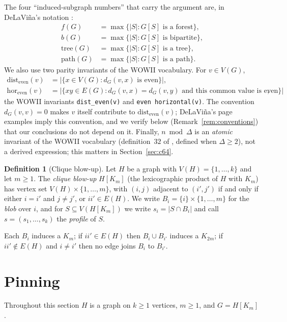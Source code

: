 \documentclass[10pt,a4paper]{article}
\theoremstyle{plain}
\theoremstyle{definition}
\newtheorem{definition}[theorem]{Definition}
\newcommand{\forestnum}{f}
\newcommand{\bipnum}{b}
\newcommand{\treenum}{\mathrm{tree}}
\newcommand{\pathnum}{\mathrm{path}}
\newcommand{\de}{\mathrm{dist_{even}}}
\newcommand{\eh}{\mathrm{hor_{even}}}
\begin{document}
The four ``induced-subgraph numbers'' that carry the argument are, in DeLaVi\~na's notation
\cite{wowiidefs}:
\[
\begin{array}{ll}
\forestnum(G) &= \max\{|S| : G[S] \text{ is a forest}\},\\
\bipnum(G)    &= \max\{|S| : G[S] \text{ is bipartite}\},\\
\treenum(G)   &= \max\{|S| : G[S] \text{ is a tree}\},\\
\pathnum(G)   &= \max\{|S| : G[S] \text{ is a path}\}.
\end{array}
\]
We also use two parity invariants of the WOWII vocabulary. For $v \in V(G)$,
\begin{align*}
\de(v) &= |\{x \in V(G) : d_G(v,x) \text{ is even}\}|,\\
\eh(v) &= |\{xy \in E(G) : d_G(v,x) = d_G(v,y) \text{ and this common value is even}\}|,
\end{align*}
the WOWII invariants \texttt{dist\_even(v)} and \texttt{even horizontal(v)}. The convention
$d_G(v,v) = 0$ makes $v$ itself contribute to $\de(v)$; DeLaVi\~na's page examples imply this
convention, and we verify below (Remark~\ref{rem:conventions}) that our conclusions do not
depend on it. Finally, $n \bmod \Delta$ is an \emph{atomic} invariant of the WOWII vocabulary
(definition~$32$ of \cite{wowiidefs}, defined when $\Delta \ge 2$), not a derived expression;
this matters in Section~\ref{sec:c64}.

\begin{definition}[Clique blow-up]
Let $H$ be a graph with $V(H) = \{1,\dots,k\}$ and let $m \ge 1$. The \emph{clique blow-up}
$H[K_m]$ (the lexicographic product of $H$ with $K_m$) has vertex set
$V(H) \times \{1,\dots,m\}$, with $(i,j)$ adjacent to $(i',j')$ if and only if either $i = i'$
and $j \ne j'$, or $ii' \in E(H)$. We write $B_i = \{i\} \times \{1,\dots,m\}$ for the
\emph{blob} over $i$, and for $S \subseteq V(H[K_m])$ we write $s_i = |S \cap B_i|$ and call
$s = (s_1,\dots,s_k)$ the \emph{profile} of $S$.
\end{definition}

Each $B_i$ induces a $K_m$; if $ii' \in E(H)$ then $B_i \cup B_{i'}$ induces a $K_{2m}$; if
$ii' \notin E(H)$ and $i \ne i'$ then no edge joins $B_i$ to $B_{i'}$.

\section{Pinning}\label{sec:pinning}

Throughout this section $H$ is a graph on $k \ge 1$ vertices, $m \ge 1$, and $G = H[K_m]$.
\end{document}
